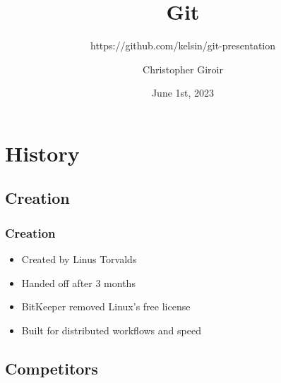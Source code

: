 \usepackage{color}
\usepackage{float}
\usepackage{hyperref}



\usepackage{beamerthemesplit}


\title{Git}
\subtitle{https://github.com/kelsin/git-presentation}
\author{Christopher Giroir}
\date{June 1st, 2023}

\newcommand{\dia}[1]{\begin{figure}[H]\centerline{\xymatrix{#1}}\end{figure}}
\newcommand{\code}[2]{\ttfamily\begin{block}{\textnormal{#1}}#2\end{block}\normalfont}



\maketitle

\begin{frame}
  \titlepage
\end{frame}

\begin{frame}
  \tableofcontents[hideallsubsections]
\end{frame}

\section{History}

\subsection{Creation}

\begin{frame}
  \frametitle{Creation}
  \begin{itemize}
  \item Created by Linus Torvalds
  \pause
  \item Handed off after 3 months
  \pause
  \item BitKeeper removed Linux's free license
  \pause
  \item Built for distributed workflows and speed
  \end{itemize}
\end{frame}

\subsection{Competitors}

